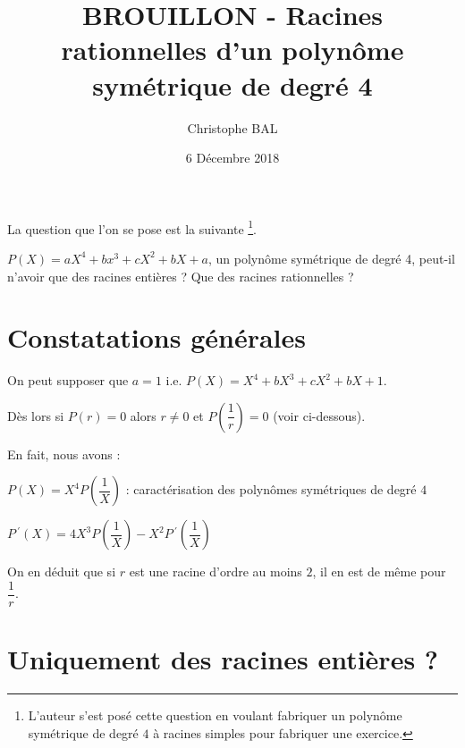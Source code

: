 \documentclass[12pt]{amsart}
\begin{document}
\title{BROUILLON - Racines rationnelles d'un polynôme symétrique de degré 4}
\author{Christophe BAL}
\date{6 Décembre 2018}
\maketitle

La question que l'on se pose est la suivante
\footnote{
	L'auteur s'est posé cette question en voulant fabriquer un polynôme symétrique de degré $4$ à racines \og simples \fg{} pour fabriquer une exercice.
}.

\begin{tcolorbox}
	$P(X) = a X^4 + b x^3 + c X^2 + b X + a$, un polynôme symétrique de degré 4, peut-il n'avoir que des racines entières ? Que des racines rationnelles ?
\end{tcolorbox}



\section{Constatations générales}

On peut supposer que $a = 1$ i.e. $P(X) = X^4 + b X^3 + c X^2 + b X + 1$.

Dès lors si $P(r) = 0$ alors $r \neq 0$ et $P\left( \dfrac1r \right) = 0$ (voir ci-dessous).

En fait, nous avons :

\medskip

$P(X) = X^4 P\left( \dfrac1X \right)$ : caractérisation des polynômes symétriques de degré $4$

\medskip

$P\,^{\prime}(X) = 4 X^3 P\left( \dfrac1X \right) 
            - X^2 P\,^{\prime}\left( \dfrac1X \right)$

%
%

On en déduit que si $r$ est une racine d'ordre au moins $2$, il en est de même pour $\dfrac1r$.


\section{Uniquement des racines entières ?}
\end{document}
